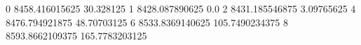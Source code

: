 0 8458.416015625 30.328125
1 8428.087890625 0.0
2 8431.185546875 3.09765625
4 8476.794921875 48.70703125
6 8533.8369140625 105.7490234375
8 8593.8662109375 165.7783203125
